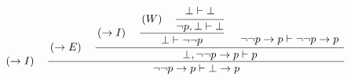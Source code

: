 \documentclass{standalone}
\begin{document}
$
\left(\rightarrow{}I\right)\quad
\cfrac{
  \left(\rightarrow{}E\right)\quad
  \cfrac{
    \left(\rightarrow{}I\right)\quad
    \cfrac{
      \left(W\right)\quad
      \cfrac{
        \bot\vdash\bot
      }{
        \lnot{}p,\bot\vdash\bot
      }
    }{
      \bot\vdash\lnot\lnot{}p
    }
    \quad
    \begin{array}{c}\\\lnot\lnot{}p\rightarrow{}p\vdash{}\lnot\lnot{}p\rightarrow{}p\end{array}
  }{
    \bot,\lnot\lnot{}p\rightarrow{}p\vdash{}p
  }
}{
  \lnot\lnot{}p\rightarrow{}p\vdash{}\bot\rightarrow{}p
}
$
\end{document}
